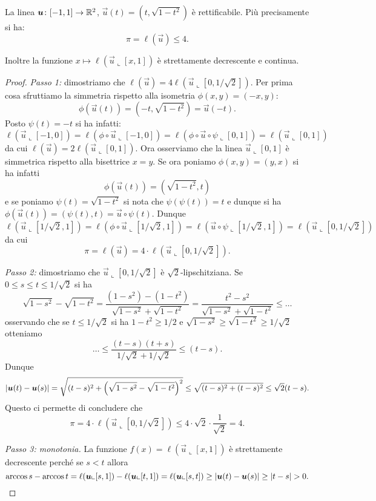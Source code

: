 \begin{theorem}
\label{th:ell_u}%
La linea $\boldsymbol u\colon [-1,1]\to {\mathbb R}^2$, $\vec u(t) = (t,\sqrt{1-t^2})$
è rettificabile. Più precisamente si ha:
\[
  \pi  = \ell(\vec u) \le 4.  
\]

Inoltre la funzione $x\mapsto \ell(\vec u\llcorner [x,1])$ 
è strettamente decrescente e continua.
\end{theorem}
\begin{proof}

\emph{Passo 1:}
dimostriamo che $\ell(\vec u ) = 4 \ell(\vec u\llcorner[0,1/\sqrt 2])$. 
Per prima cosa sfruttiamo la simmetria rispetto alla isometria 
$\phi(x,y) = (-x,y)$:
\[
  \phi(\vec u(t)) = (-t,\sqrt{1-t^2})
  = \vec u(-t).
\]
Posto $\psi(t)=-t$ si ha infatti:
\[
\ell(\vec u \llcorner[-1,0]) 
= \ell(\phi\circ \vec u \llcorner [-1,0])
= \ell(\phi\circ \vec u \circ \psi \llcorner[0,1])
= \ell(\vec u\llcorner[0,1])
\]
da cui $\ell(\vec u) = 2 \ell(\vec u \llcorner[0,1])$.
Ora osserviamo che la linea $\vec u\llcorner[0,1]$ 
è simmetrica rispetto alla bisettrice $x=y$.
Se ora poniamo $\phi(x,y) = (y,x)$ si ha infatti 
\[
\phi(\vec u(t)) = (\sqrt{1-t^2},t)   
\]
e se poniamo $\psi(t) = \sqrt{1-t^2}$ si nota che 
$\psi(\psi(t)) = t$ e dunque 
si ha $\phi(\vec u(t)) = (\psi(t),t)
=\vec u\circ \psi(t)$. 
Dunque 
\[
\ell(\vec u\llcorner[1/\sqrt 2,1])
= \ell(\phi\circ \vec u \llcorner[1/\sqrt 2, 1])
= \ell(\vec u\circ \psi \llcorner[1/\sqrt 2, 1])  
= \ell(\vec u\llcorner [0,1/\sqrt 2])
\]
da cui 
\[
\pi = \ell(\vec u) = 4 \cdot \ell(\vec u \llcorner[0,1/\sqrt 2]).  
\]

\emph{Passo 2:} 
dimostriamo che $\vec u\llcorner[0,1/\sqrt 2]$ è $\sqrt 2$-lipschitziana.
Se $0 \le s\le t\le 1/\sqrt 2$ si ha 
\[
  \sqrt{1-s^2} - \sqrt{1-t^2}
  = \frac{(1-s^2) - (1-t^2)}{\sqrt{1-s^2} + \sqrt{1-t^2}}
  = \frac{t^2-s^2}{\sqrt{1-s^2} + \sqrt{1-t^2}}
  \le \dots 
\]
osservando che se $t\le 1/\sqrt 2$ si ha $1-t^2 \ge 1/2$
e $\sqrt{1-s^2} \ge \sqrt{1-t^2} \ge 1/\sqrt 2$
otteniamo 
\[
  \dots 
  \le \frac{(t-s)(t+s)}{1/\sqrt 2 + 1/\sqrt 2}
  \le (t-s).
\]
Dunque 
\[
  {\left|\boldsymbol u(t)-\boldsymbol u(s)\right|}
  =\sqrt{(t-s)^2 + {\left( \sqrt{1-s^2}-\sqrt{1-t^2} \right)}^2}
  \le \sqrt{(t-s)^2 + (t-s)^2} \le \sqrt 2 (t-s).  
\]
Questo ci permette di concludere che 
\[
\pi = 4 \cdot \ell(\vec u\llcorner [0,1/\sqrt 2])
\le 4 \cdot \sqrt 2 \cdot \frac{1}{\sqrt 2} = 4.  
\]

\emph{Passo 3: monotonia.}
  La funzione $f(x)=\ell(\vec u\llcorner[x,1])$ 
  è strettamente decrescente perché se $s<t$ allora 
  \[
   \arccos s - \arccos t 
   = \ell(\boldsymbol u\llcorner [s,1]) - \ell(\boldsymbol u\llcorner [t,1])  
   = \ell(\boldsymbol u\llcorner [s,t]) 
   \ge {\left|\boldsymbol u(t)-\boldsymbol u(s)\right|} 
   \ge {\left|t-s\right|} > 0.
  \]


\end{proof}

